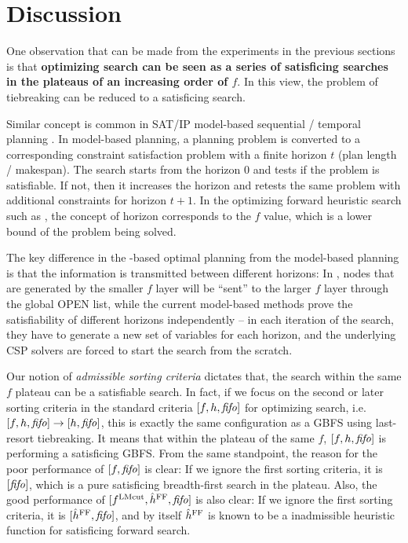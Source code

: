 \clearpage 
\section{Discussion}
\label{sec:discussion}

One observation that can be made from the experiments in the previous
sections is that \textbf{optimizing search can be seen as a series of
satisficing searches in the plateaus of an increasing order
of $f$}. In this view, the problem of tiebreaking can be reduced to a
satisficing search.

Similar concept is common in SAT/IP model-based sequential / temporal
planning \cite{rintanen2012planning,van2005optiplan}. In model-based
planning, a planning problem is converted to a corresponding constraint
satisfaction problem with a finite horizon $t$ (plan length /
makespan). The search starts from the horizon 0
and tests if the problem is satisfiable. If not, then it increases the
horizon and retests the same problem with additional constraints for
horizon $t+1$. In the optimizing forward heuristic search such as
\astar, the concept of horizon corresponds to the $f$ value, which is a
lower bound of the problem being solved.

The key difference in the \astar-based optimal planning from the model-based planning is
that the information is transmitted between different horizons:
In \astar, nodes that are generated by the smaller
$f$ layer will be ``sent'' to the larger $f$ layer through the global OPEN
list, while the current model-based methods prove the satisfiability of
different horizons independently -- in each iteration of the search,
they have to generate a new set of variables for each horizon, and the
underlying CSP solvers are forced to start the search from the scratch.

Our notion of \emph{admissible sorting criteria} dictates that, the
search within the same $f$ plateau can be a satisfiable search. In fact,
if we focus on the second or later sorting criteria in the standard criteria
$[f,h,{\text{\textit{fifo}}}]$ for optimizing search, i.e. $[f,h,{\text{\textit{fifo}}}] \rightarrow [h,{\text{\textit{fifo}}}]$, this is exactly
the same configuration as a GBFS using \fifo last-resort tiebreaking. It
means that within the plateau of the same $f$, $[f,h,{\text{\textit{fifo}}}]$ is
performing a satisficing GBFS.
From the same standpoint, the reason for the poor performance of $[f,{\text{\textit{fifo}}}]$
is clear: If we ignore the first sorting criteria, it is $[{\text{\textit{fifo}}}]$,
which is a pure satisficing breadth-first search in the plateau.
Also, the good performance of $[f^{\text{LMcut}},\hat{h}^{\text{FF}},{\text{\textit{fifo}}}]$ is also clear:
If we ignore the first sorting criteria, it is $[\hat{h}^{\text{FF}},{\text{\textit{fifo}}}]$,
and by itself $\hat{h}^{\text{FF}}$ is known to be a \sota inadmissible heuristic
function for satisficing forward search.

